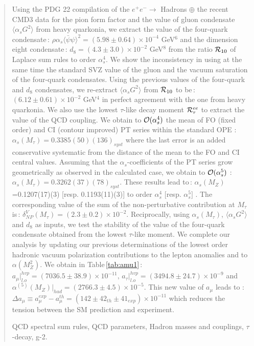 \documentclass[review]{elsarticle}
\def\la{\langle}
\def\ra{\rangle}
\begin{document}
\begin{frontmatter}
\date{\today}
\begin{abstract}
\noindent
Using the PDG 22 compilation of the $e^+e^-\to$  Hadrons $\oplus$ the recent CMD3 data for the pion form factor and the value of gluon condensate $\la\alpha_s G^2\ra$ from heavy quarkonia, we extract the value of the four-quark condensate\,:  $\rho\alpha_s\la\bar\psi\psi\ra^2= (5.98\pm 0.64)\times 10^{-4}$ GeV$^6$  and 
the dimension eight condensate\,: $d_8= (4.3\pm 3.0)\times 10^{-2}$ GeV$^8$
from the ratio ${\cal R}_{10}$ of Laplace sum rules to order $\alpha_s^4$.  We show the inconsistency in using at the same time the standard SVZ value of the gluon and the vacuum saturation of the four-quark condensates.  Using the previous values of the four-quark and $d_8$ condensates, we re-extract $\la\alpha_s G^2\ra$ from ${\cal R}_{10}$ to be\,:  $(6.12\pm 0.61)\times 10^{-2}$ GeV$^4$ in perfect agreement with the one from heavy quarkonia. We also use
the lowest $\tau$-like decay moment ${\cal R}_\tau^{ee}$ to extract the value of the QCD coupling. We obtain to  ${\cal O}(\alpha_s^4)$ the mean of FO (fixed order) and CI (contour improved)  PT series within the standard OPE : $\alpha_s(M_\tau)=0.3385(50)(136)_{syst}$ where the last error is an added conservative systematic from the distance of the mean to  the FO and CI central values. Assuming that the $\alpha_s$-coefficients of the PT series grow geometrically as observed in the calculated case, we obtain to ${\cal O}(\alpha_s^5)$ :   $\alpha_s(M_\tau)=0.3262(37)(78)_{syst}$.  These  results lead to\,: $\alpha_s(M_Z)$=0.1207(17)(3) [resp. 0.1193(11)(3)] to order $\alpha_s^4$ [resp. $\alpha_s^5]$ . The corresponding value of the sum of the non-perturbative contribution at $M_\tau$ is\,: $\delta^V_{NP}(M_\tau)=(2.3\pm 0.2)\times 10^{-2}$. Reciprocally, using $\alpha_s(M_\tau)$, $\la\alpha_s G^2\ra$ and $d_8$ as inputs, we test the stability of the value of the four-quark condensate obtained from the lowest $\tau$-like moment. 
We complete our analysis by updating our previous determinations of the lowest order hadronic vacuum polarization  contributions to the lepton anomalies and to $\alpha(M^2_Z)$.  We obtain in Table\,\ref{tab:amu1}\,: $a_\mu\vert^{hvp}_{l.o}= (7036.5\pm 38.9)\times10^{-11}, \, a_\tau\vert^{hvp}_{l.o}= (3494.8\pm 24.7)\times10^{-9} $ and $\alpha^{(5)}(M_Z)\vert_{had}=(2766.3\pm 4.5)\times 10^{-5}$. This new value of $a_\mu$ leads to : $\Delta a_\mu\equiv a_\mu^{exp}-a_\mu^{th} = (142\pm 42_{th}\pm 41_{exp})\times 10^{-11}$ which reduces the tension between the SM prediction and experiment.
\begin{keyword}  QCD spectral sum rules, QCD parameters,  Hadron masses and couplings, $\tau$-decay, g-2.


\end{keyword}
\end{abstract}
\end{frontmatter}
\end{document}
